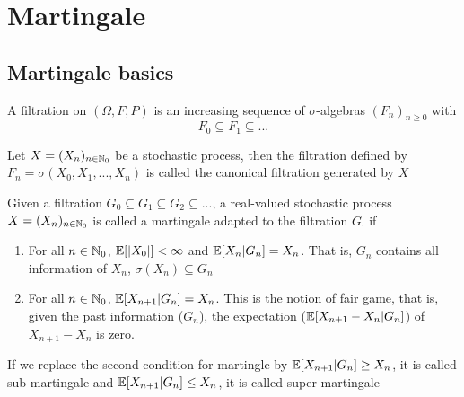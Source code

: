 \documentclass{report}
\begin{document}

\chapter{Martingale}

\section{Martingale basics}

\begin{definition}
	A filtration on $(\Omega, F, P)$ is an increasing sequence of $\sigma$-algebras $(F_n)_{n \geq 0}$ with 
	$$
		F_0 \subseteq F_1 \subseteq ...
	$$
\end{definition}

\begin{remark}
	Let $X = (X_n)_{n \in \mathbb{N}_0}$ be a stochastic process, then the filtration defined by $F_n = \sigma(X_0, X_1, ..., X_n)$ is called the canonical filtration generated by $X$
\end{remark}

\begin{definition}[martingale]
	Given a filtration $G_0 \subseteq G_1 \subseteq G_2 \subseteq ...$, a real-valued stochastic process $X = (X_n)_{n \in \mathbb{N}_0}$ is called a martingale adapted to the filtration $G_\cdot$ if
	\begin{enumerate}
		\item For all $n \in \mathbb{N}_0$, $\mathbb{E}[|X_0|] < \infty$ and $\mathbb{E}[X_n | G_n] = X_n$. That is, $G_n$ contains all information of $X_n$, $\sigma(X_n) \subseteq G_n$
		\item For all $n \in \mathbb{N}_0$, $\mathbb{E}[X_{n+1} | G_n] = X_n$. This is the notion of fair game, that is, given the past information ($G_n$), the expectation ($\mathbb{E}[X_{n+1} - X_n | G_n]$) of $X_{n+1} - X_n$ is zero.
	\end{enumerate}
	
\end{definition}

\begin{remark}
	If we replace the second condition for martingle by $\mathbb{E}[X_{n+1} | G_n] \geq X_n$, it is called sub-martingale and $\mathbb{E}[X_{n+1} | G_n] \leq X_n$, it is called super-martingale
\end{remark}
 
\end{document}
